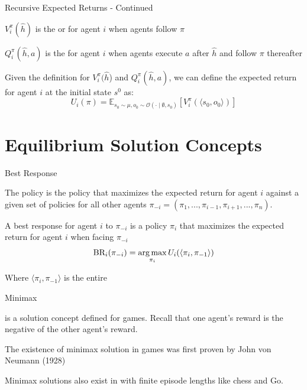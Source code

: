 \begin{frame}{Recursive Expected Returns - Continued}

    \blist
        \item \(V^{\pi}_i(\hat{h})\) is the  or  for agent \(i\) when agents follow  \(\pi\)
        \item \(Q^{\pi}_i(\hat{h}, a)\) is the  for agent \(i\) when agents execute  \(a\) after \(\hat{h}\) and follow \(\pi\) thereafter
        \item Given the definition for \(V^{\pi}_i(\hat{h}\)) and  \(Q^{\pi}_i(\hat{h}, a)\), we can define the expected return for agent \(i\) at the initial state \(s^0\) as:
    \elist
    \vspace{2pt}
    \[
    U_i(\pi) = \mathbb{E}_{s_0 \sim \mu, o_0 \sim \mathcal{O}(\cdot \mid \emptyset,  s_0)} \left[ V^{\pi}_i(\langle s_0, o_0 \rangle) \right]
    \]
    
\end{frame}


\section{Equilibrium Solution Concepts}

\begin{frame}{Best Response}

    The  policy is the policy that maximizes the expected return for agent \(i\) against a given set of policies for all other agents \(\pi_{-i} = (\pi_1, ..., \pi_{i-1}, \pi_{i+1}, ..., \pi_{n})\).

    \blist
        \item  A best response for agent \(i\) to \(\pi_{-i}\) is a policy \(\pi_i\) that maximizes the expected return for agent \(i\) when facing \(\pi_{-i}\)
    \elist
    \vspace{2pt}
    \[
        \text{BR}_i(\pi_{-i}) = \operatorname*{arg\,max}_{\pi_{i}} U_i(\langle\pi_i, \pi_{-1}\rangle)
    \]

    \blist
        \item Where $\langle\pi_i, \pi_{-1}\rangle$ is the entire 
    \elist
    
\end{frame}

\begin{frame}{Minimax}

     is a solution concept defined for  games. Recall that one agent's reward is the negative of the other agent's reward.
    \blist
        \item The existence of minimax solution in  games was first proven by John von Neumann (1928)
        \item Minimax solutions also exist in with finite episode lengths like chess and Go. 
    \elist
    
\end{frame}

